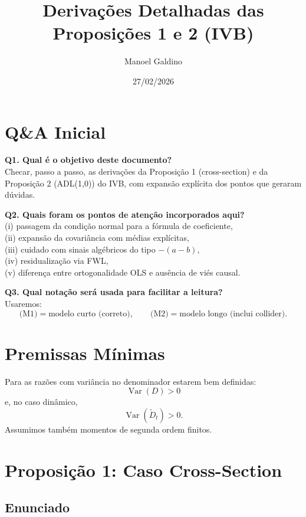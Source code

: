 \documentclass[
]{article}
\title{Derivações Detalhadas das Proposições 1 e 2 (IVB)}
\author{Manoel Galdino}
\date{27/02/2026}
\begin{document}
\maketitle

\section{Q\&A Inicial}\label{qa-inicial}

\textbf{Q1. Qual é o objetivo deste documento?}\\
Checar, passo a passo, as derivações da Proposição 1 (cross-section) e
da Proposição 2 (ADL(1,0)) do IVB, com expansão explícita dos pontos que
geraram dúvidas.

\textbf{Q2. Quais foram os pontos de atenção incorporados aqui?}\\
(i) passagem da condição normal para a fórmula de coeficiente,\\
(ii) expansão da covariância com médias explícitas,\\
(iii) cuidado com sinais algébricos do tipo \(- (a-b)\),\\
(iv) residualização via FWL,\\
(v) diferença entre ortogonalidade OLS e ausência de viés causal.

\textbf{Q3. Qual notação será usada para facilitar a leitura?}\\
Usaremos: \[
\text{(M1)} = \text{modelo curto (correto)}, \qquad
\text{(M2)} = \text{modelo longo (inclui collider)}.
\]

\section{Premissas Mínimas}\label{premissas-muxednimas}

Para as razões com variância no denominador estarem bem definidas: \[
\operatorname{Var}(D)>0
\] e, no caso dinâmico, \[
\operatorname{Var}(\widetilde{D}_t)>0.
\] Assumimos também momentos de segunda ordem finitos.

\section{Proposição 1: Caso
Cross-Section}\label{proposiuxe7uxe3o-1-caso-cross-section}

\subsection{Enunciado}\label{enunciado}
\end{document}
